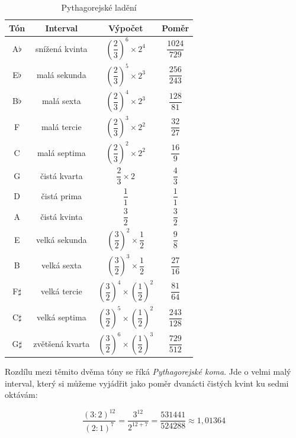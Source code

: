 \documentclass[12pt]{article}
\begin{document}
\begin{table}[p]\centering
	\begin{tabular}{c c c c}
		\textbf{Tón} & \textbf{Interval} & \textbf{Výpočet} & \textbf{Poměr} \\ \hline
		A$\flat$ & snížená kvinta & $\left(\dfrac{2}{3}\right)^6 \times 2^4$ & $\dfrac{1024}{729}$ \\
		E$\flat$ & malá sekunda & $\left(\dfrac{2}{3}\right)^5 \times 2^3$ & $\dfrac{256}{243}$ \\
		B$\flat$ & malá sexta & $\left(\dfrac{2}{3}\right)^4 \times 2^3$ & $\dfrac{128}{81}$ \\
		F & malá tercie & $\left(\dfrac{2}{3}\right)^3 \times 2^2$ & $\dfrac{32}{27}$ \\
		C & malá septima & $\left(\dfrac{2}{3}\right)^2 \times 2^2$ & $\dfrac{16}{9}$ \\
		G & čistá kvarta & $\dfrac{2}{3} \times 2$ & $\dfrac{4}{3}$ \\
		D & čistá prima & $\dfrac{1}{1}$ & $\dfrac{1}{1}$ \\
		A & čistá kvinta & $\dfrac{3}{2}$ & $\dfrac{3}{2}$ \\
		E & velká sekunda & $\left(\dfrac{3}{2}\right)^2 \times \dfrac{1}{2}$ & $\dfrac{9}{8}$ \\
		B & velká sexta & $\left(\dfrac{3}{2}\right)^3 \times \dfrac{1}{2}$ & $\dfrac{27}{16}$ \\
		F$\sharp$ & velká tercie & $\left(\dfrac{3}{2}\right)^4 \times \left(\dfrac{1}{2}\right)^2$ & $\dfrac{81}{64}$ \\
		C$\sharp$ & velká septima & $\left(\dfrac{3}{2}\right)^5 \times \left(\dfrac{1}{2}\right)^2$ & $\dfrac{243}{128}$ \\
		G$\sharp$ & zvětšená kvarta & $\left(\dfrac{3}{2}\right)^6 \times \left(\dfrac{1}{2}\right)^3$ & $\dfrac{729}{512}$ \\
	\end{tabular}
	\caption{Pythagorejské ladění}
	\label{tbl:pythagorean}
\end{table}

Rozdílu mezi těmito dvěma tóny se říká \emph{Pythagorejské koma}. Jde o velmi malý interval, který si můžeme vyjádřit jako poměr dvanácti čistých kvint ku sedmi oktávám:

\begin{equation}
\dfrac{\left(3 : 2\right)^{12}}{\left(2 : 1\right)^7} = \dfrac{3^{12}}{2^{12 + 7}} = \dfrac{531441}{524288} \approx 1,01364
\end{equation}
\end{document}
